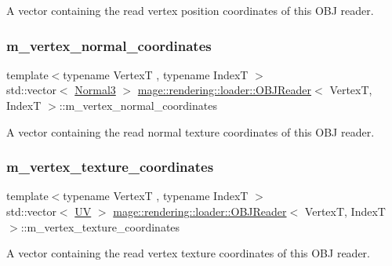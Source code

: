 A vector containing the read vertex position coordinates of this O\+BJ reader. \mbox{\label{classmage_1_1rendering_1_1loader_1_1_o_b_j_reader_ac977ade8154bef446524526e8297f3eb}} 
\subsubsection{\texorpdfstring{m\+\_\+vertex\+\_\+normal\+\_\+coordinates}{m\_vertex\_normal\_coordinates}}
{\footnotesize\ttfamily template$<$typename VertexT , typename IndexT $>$ \\
std\+::vector$<$ \mbox{\hyperlink{structmage_1_1_normal3}{Normal3}} $>$ \mbox{\hyperlink{classmage_1_1rendering_1_1loader_1_1_o_b_j_reader}{mage\+::rendering\+::loader\+::\+O\+B\+J\+Reader}}$<$ VertexT, IndexT $>$\+::m\+\_\+vertex\+\_\+normal\+\_\+coordinates\hspace{0.3cm}{\ttfamily [private]}}

A vector containing the read normal texture coordinates of this O\+BJ reader. \mbox{\label{classmage_1_1rendering_1_1loader_1_1_o_b_j_reader_aed919290e638cbe00a9144fdcb652178}} 
\subsubsection{\texorpdfstring{m\+\_\+vertex\+\_\+texture\+\_\+coordinates}{m\_vertex\_texture\_coordinates}}
{\footnotesize\ttfamily template$<$typename VertexT , typename IndexT $>$ \\
std\+::vector$<$ \mbox{\hyperlink{structmage_1_1_u_v}{UV}} $>$ \mbox{\hyperlink{classmage_1_1rendering_1_1loader_1_1_o_b_j_reader}{mage\+::rendering\+::loader\+::\+O\+B\+J\+Reader}}$<$ VertexT, IndexT $>$\+::m\+\_\+vertex\+\_\+texture\+\_\+coordinates\hspace{0.3cm}{\ttfamily [private]}}

A vector containing the read vertex texture coordinates of this O\+BJ reader. 